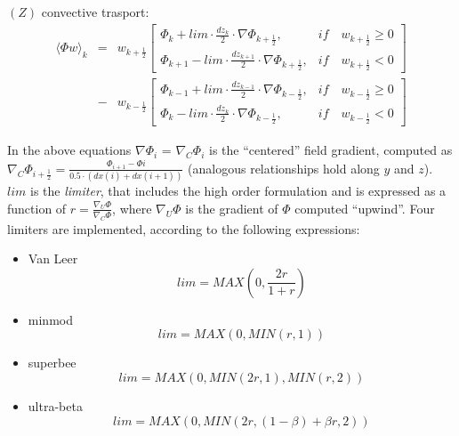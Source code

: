 $(Z)$ convective trasport:
\begin{eqnarray}
\langle \Phi w \rangle_{k} & = & w_{k+\frac{1}{2}}
\left[ \begin{array}{cc}
\displaystyle{\Phi_{k} +lim \cdot\frac{dz_k}{2} \cdot \nabla\Phi_{k+\frac{1}{2}}}, & \textstyle{if} \quad w_{k+\frac{1}{2}}  \ge 0 \\
\displaystyle{\Phi_{k+1} -lim \cdot\frac{dz_{k+1}}{2} \cdot \nabla\Phi_{k+\frac{1}{2}}}, & \textstyle{if} \quad w_{k+\frac{1}{2}} < 0
\end{array} \right] \\ \nonumber
%
                               & - & w_{k-\frac{1}{2}}
\left[ \begin{array}{cc}
\displaystyle{\Phi_{k-1} +lim \cdot\frac{dz_{k-1}}{2} \cdot \nabla\Phi_{k-\frac{1}{2}}}, & \textstyle{if} \quad w_{k-\frac{1}{2}}  \ge 0 \\
\displaystyle{\Phi_{k} -lim \cdot\frac{dz_k}{2} \cdot \nabla\Phi_{k-\frac{1}{2}}}, & \textstyle{if} \quad w_{k-\frac{1}{2}} < 0
\end{array} \right] \nonumber
%
\end{eqnarray}

In the above equations $\nabla\Phi_i$ = $\nabla_C\Phi_i$ is the ``centered'' field gradient, computed as $\nabla_C\Phi_{i+\frac{1}{2}}= \frac{\Phi_{i+1}-\Phi{i}}{0.5\cdot(dx(i)+dx(i+1))} $ (analogous relationships hold along $y$ and $z$). $lim$ is the {\em limiter}, that includes the high order formulation and is expressed as a function
of $r=\frac{\nabla_U\Phi}{\nabla_C\Phi}$, where $\nabla_U\Phi$ is the gradient 
of $\Phi$ computed ``upwind''. Four limiters are implemented, according to the
following expressions:
\begin{itemize}
\item  Van Leer
\begin{equation}
lim = MAX( 0, \frac{2r}{1+r} )
\end{equation}
\item minmod
\begin{equation}
lim = MAX( 0, MIN( r, 1 ))
\end{equation}
\item superbee
\begin{equation}
lim = MAX( 0, MIN( 2r, 1 ), MIN( r, 2 ))
\end{equation}
\item ultra-beta
\begin{equation}
lim = MAX( 0, MIN( 2r, (1-\beta)+\beta r, 2 ))
\end{equation}
\end{itemize}
%
\newpage
%
